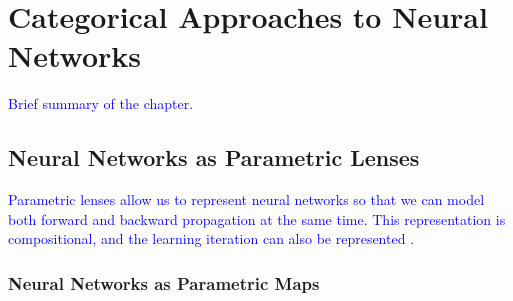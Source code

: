 \documentclass[12pt,a4paper,openright,twoside]{report}
\theoremstyle{plain}
\theoremstyle{definition}
\begin{document}





\chapter{Categorical Approaches to Neural Networks}
\lhead[\fancyplain{}{\bfseries\thepage}]{\fancyplain{}{\bfseries\rightmark}}




\textcolor{blue}{Brief summary of the chapter.}





\section{Neural Networks as Parametric Lenses}

\textcolor{blue}{Parametric lenses allow us to represent neural networks so that we can model both forward and backward propagation at the same time. This representation is compositional, and the learning iteration can also be represented \cite{cruttwellDeepLearningParametric}.}






\subsection{Neural Networks as Parametric Maps}
\end{document}
